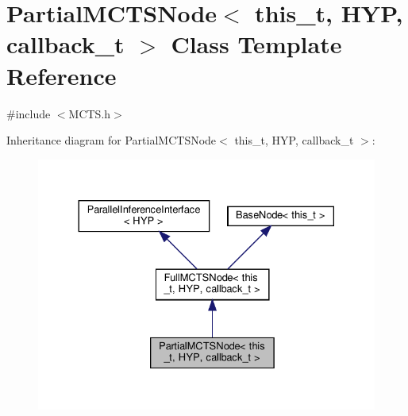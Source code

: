 \hypertarget{class_partial_m_c_t_s_node}{}\section{Partial\+M\+C\+T\+S\+Node$<$ this\+\_\+t, H\+YP, callback\+\_\+t $>$ Class Template Reference}
\label{class_partial_m_c_t_s_node}


{\ttfamily \#include $<$M\+C\+T\+S.\+h$>$}



Inheritance diagram for Partial\+M\+C\+T\+S\+Node$<$ this\+\_\+t, H\+YP, callback\+\_\+t $>$\+:\nopagebreak
\begin{figure}[H]
\begin{center}
\leavevmode
\includegraphics[width=330pt]{class_partial_m_c_t_s_node__inherit__graph}
\end{center}
\end{figure}


